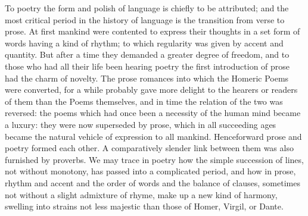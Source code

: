 \documentclass[11pt,letter]{article}
\begin{document}
\par  To poetry the form and polish of language is chiefly to be attributed; and the most critical period in the history of language is the transition from verse to prose. At first mankind were contented to express their thoughts in a set form of words having a kind of rhythm; to which regularity was given by accent and quantity. But after a time they demanded a greater degree of freedom, and to those who had all their life been hearing poetry the first introduction of prose had the charm of novelty. The prose romances into which the Homeric Poems were converted, for a while probably gave more delight to the hearers or readers of them than the Poems themselves, and in time the relation of the two was reversed: the poems which had once been a necessity of the human mind became a luxury: they were now superseded by prose, which in all succeeding ages became the natural vehicle of expression to all mankind. Henceforward prose and poetry formed each other. A comparatively slender link between them was also furnished by proverbs. We may trace in poetry how the simple succession of lines, not without monotony, has passed into a complicated period, and how in prose, rhythm and accent and the order of words and the balance of clauses, sometimes not without a slight admixture of rhyme, make up a new kind of harmony, swelling into strains not less majestic than those of Homer, Virgil, or Dante.
\end{document}
